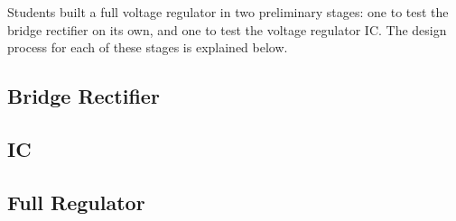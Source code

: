 Students built a full voltage regulator in two preliminary stages: one to test
the bridge rectifier on its own, and one to test the voltage regulator IC.  The
design process for each of these stages is explained below.

\subsection{Bridge Rectifier}
\begin{figure}[H]
	\centering
	
\end{figure}

\subsection{IC}
\begin{figure}[H]
	\centering
	
\end{figure}

\subsection{Full Regulator}
\begin{figure}[H]
	\centering
	
\end{figure}
